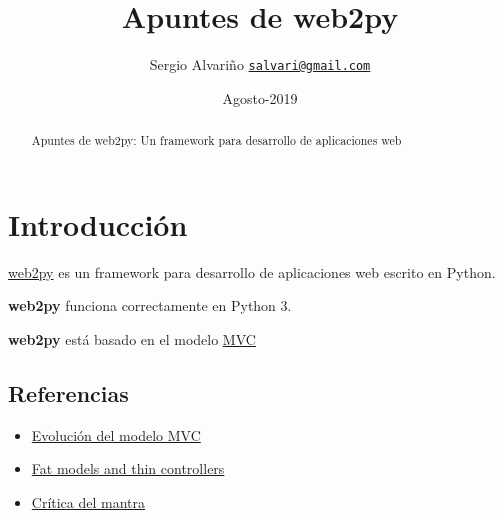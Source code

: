 \documentclass[
  12pt,
  spanish,
]{article}
\title{Apuntes de web2py}
\author{Sergio Alvariño
\href{mailto:salvari@gmail.com}{\nolinkurl{salvari@gmail.com}}}
\date{Agosto-2019}
\providecommand{\tightlist}{%
  \setlength{\itemsep}{0pt}\setlength{\parskip}{0pt}}
\begin{document}
\maketitle
\begin{abstract}
Apuntes de web2py: Un framework para desarrollo de aplicaciones web
\end{abstract}

{
\hypersetup{linkcolor=}
\setcounter{tocdepth}{3}
\tableofcontents
}
\hypertarget{introducciuxf3n}{%
\section{Introducción}\label{introducciuxf3n}}

\href{http://www.web2py.com/}{web2py} es un framework para desarrollo de
aplicaciones web escrito en Python.

\textbf{web2py} funciona correctamente en Python 3.

\textbf{web2py} está basado en el modelo
\href{https://es.wikipedia.org/wiki/Modelo\%E2\%80\%93vista\%E2\%80\%93controlador}{MVC}

\hypertarget{referencias}{%
\subsection{Referencias}\label{referencias}}

\begin{itemize}
\tightlist
\item
  \href{https://martinfowler.com/eaaDev/uiArchs.html}{Evolución del
  modelo MVC}
\item
  \href{https://nomadphp.com/blog/60/working-with-the-thin-controller-and-fat-model-concept-in-laravel}{Fat
  models and thin controllers}
\item
  \href{https://nomadphp.com/blog/60/working-with-the-thin-controller-and-fat-model-concept-in-laravel}{Crítica
  del mantra}
\end{itemize}
\end{document}
